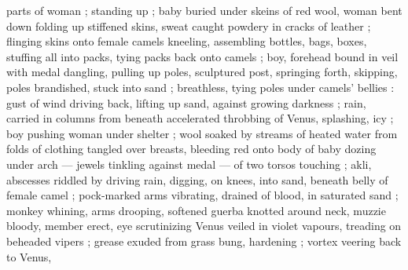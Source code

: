parts of woman ; standing up ; baby buried under skeins of red wool, 
woman bent down folding up stiffened skins, sweat caught powdery 
in cracks of leather ; flinging skins onto female camels kneeling, 
assembling bottles, bags, boxes, stuffing all into packs, tying packs 
back onto camels ; boy, forehead bound in veil with medal dangling, 
pulling up poles, sculptured post, springing forth, skipping, poles 
brandished, stuck into sand ; breathless, tying poles under camels' 
bellies : gust of wind driving back, lifting up sand, against growing 
darkness ; rain, carried in columns from beneath accelerated 
throbbing of Venus, splashing, icy ; boy pushing woman under 
shelter ; wool soaked by streams of heated water from folds of 
clothing tangled over breasts, bleeding red onto body of baby 
dozing under arch --- jewels tinkling against medal --- of two torsos 
touching ; akli, abscesses riddled by driving rain, digging, on knees, 
into sand, beneath belly of female camel ; pock-marked arms 
vibrating, drained of blood, in saturated sand ; monkey whining, 
arms drooping, softened guerba knotted around neck, muzzie 
bloody, member erect, eye scrutinizing Venus veiled in violet 
vapours, treading on beheaded vipers ; grease exuded from grass 
bung, hardening ; vortex veering back to Venus, 

